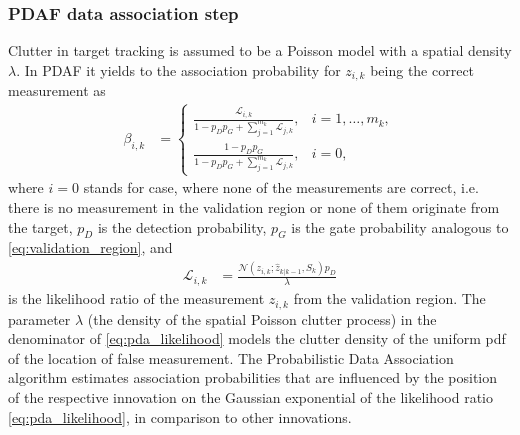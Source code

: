 \subsubsection{PDAF data association step}
Clutter in target tracking is assumed to be a Poisson model with a spatial density $\lambda$. In PDAF it yields to the association probability for $z_{i,k}$ being the correct measurement as
\begin{align}
    \beta_{i,k} &=
    \begin{cases}
        {\frac{\displaystyle\mathcal{L}_{i,k}}{\displaystyle 1-p_D p_G + \sum_{j=1}^{m_k}\mathcal{L}_{j,k}}}, & i=1, \dots, m_k, \\
        {\frac{\displaystyle 1-p_D p_G}{\displaystyle 1-p_D p_G + \sum_{j=1}^{m_k}\mathcal{L}_{j,k}}}, & i =0,
    \end{cases}
    \label{eq:pda_beta}
\end{align}
where $i=0$ stands for case, where none of the measurements are correct, i.e. there is no measurement in the
validation region or none of them originate from the target, $p_D$ is the detection probability, $p_G$ is
the gate
probability
analogous to \eqref{eq:validation_region}, and
\begin{align}
    \mathcal{L}_{i,k} &= \frac{\mathcal{N}(z_{i,k};\hat{z}_{k|k-1}, S_k) p_D}{\lambda} \label{eq:pda_likelihood}
\end{align}
is the likelihood ratio of the measurement $z_{i,k}$ from the validation region. The parameter $\lambda$ (the density
of the spatial Poisson clutter process) in the denominator of \eqref{eq:pda_likelihood} models the clutter density of
the uniform pdf of the location of false measurement. The Probabilistic Data Association algorithm estimates
association probabilities that are influenced by the position of the respective innovation on the Gaussian exponential of the likelihood ratio \eqref{eq:pda_likelihood}, in comparison to other innovations.

